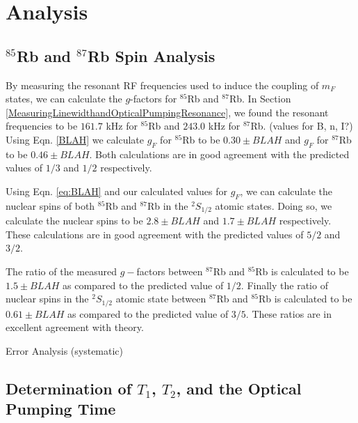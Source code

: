 
\section{Analysis}\label{analysis}

\subsection{$^{85}$Rb and $^{87}$Rb Spin Analysis}\label{SpinAnalysis}

By measuring the resonant RF frequencies used to induce the coupling of $m_F$ states, we can calculate the $g$-factors for $^{85}$Rb and $^{87}$Rb.  In Section \ref{MeasuringLinewidthandOpticalPumpingResonance}, we found the resonant frequencies to be $161.7$ kHz for $^{85}$Rb and $243.0$ kHz for $^{87}$Rb.  (values for B, n, I?) Using Eqn. \ref{BLAH} we calculate $g_F$ for $^{85}$Rb to be $0.30\pm BLAH$ and $g_F$ for $^{87}$Rb to be $0.46\pm BLAH$.  Both calculations are in good agreement with the predicted values of $1/3$ and $1/2$ respectively. 

Using Eqn. \ref{eq:BLAH} and our calculated values for $g_F$, we can calculate the nuclear spins of both $^{85}$Rb and $^{87}$Rb in the $^{2}S_{1/2}$ atomic states.  Doing so, we calculate the nuclear spins to be $2.8 \pm BLAH$ and $1.7 \pm BLAH$ respectively.  These calculations are in good agreement with the predicted values of $5/2$ and $3/2$.  

The ratio of the measured $g-$factors between $^{87}$Rb and $^{85}$Rb is calculated to be $1.5 \pm BLAH$ as compared to the predicted value of $1/2$.  Finally the ratio of nuclear spins in the $^{2}S_{1/2}$ atomic state between $^{87}$Rb and $^{85}$Rb is calculated to be $0.61\pm BLAH$ as compared to the predicted value of $3/5$.  These ratios are in excellent agreement with theory.

Error Analysis (systematic)

\subsection{Determination of $T_{1}$, $T_{2}$, and the Optical Pumping Time}\label{DeterminationofTimes}

